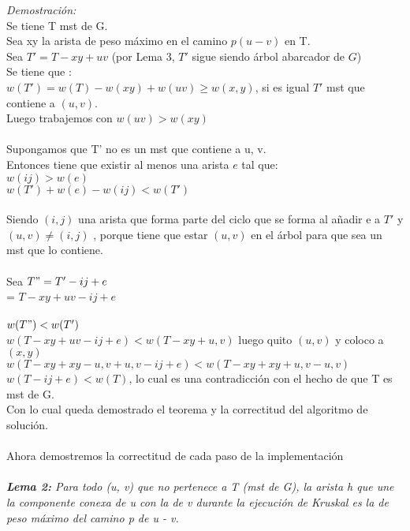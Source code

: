 \documentclass[12pt]{article}
\begin{document}
\textit{Demostraci\'on:}\\
Se tiene T mst de G.\\
Sea xy la arista de peso m\'aximo en el camino $p(u-v)$ en T.\\
Sea $T' = T- xy + uv$ (por Lema 3, $T'$ sigue siendo \'arbol abarcador de $G$)\\
Se tiene que :\\
$w(T') = w(T) - w(xy) + w(uv) \geq w(x, y)$, si es igual $T'$ mst que contiene a $(u,v)$.\\
Luego trabajemos con $w(uv) > w(xy)$\\
\\
Supongamos que T' no es un mst que contiene a u, v.\\
Entonces tiene que existir al menos una arista $e$ tal que:\\
$w(ij) > w(e)$\\ 
$w(T') +  w(e) - w(ij) < w(T')$\\
\\
Siendo $(i,j)$ una arista que forma parte del ciclo que se forma al a\~nadir e a $T'$ y $ (u,v) \neq (i,j) $ , porque tiene que estar $(u,v)$ en el \'arbol para que sea un mst que lo contiene.\\
\\
Sea $T" = T' - ij + e$\\
        =  $T -xy + uv - ij + e$\\
\\
$w(T") < w(T')$\\
$w(T - xy + uv - ij + e) < w(T - xy + u, v)$ luego quito $(u,v)$ y coloco a $(x,y)$\\
$w(T - xy + xy - u,v + u,v - ij + e) < w(T - xy + xy + u,v - u,v)$\\
$w(T - ij + e) < w(T)$, lo cual es una contradicci\'on con el hecho de que T es mst de G.\\
Con lo cual queda demostrado el teorema y la correctitud del algoritmo de soluci\'on.\\
\\

Ahora demostremos la correctitud de cada paso de la implementaci\'on\\
\\


\textit{  \textbf{Lema 2:} Para todo (u, v) que no pertenece a T (mst de G), la arista h que une la componente conexa de u con la de v durante la ejecuci\'on de Kruskal es la de peso m\'aximo del camino p de u - v.}\\
\end{document}
